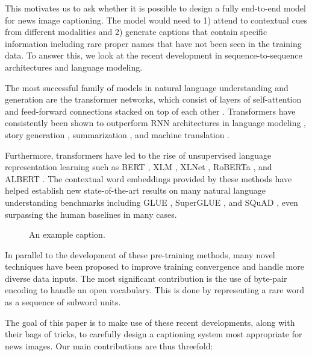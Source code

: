 \documentclass[10pt,twocolumn,letterpaper]{article}
\begin{document}
This motivates us to ask whether it is possible to design a fully end-to-end
model for news image captioning. The model would need to 1) attend to
contextual cues from different modalities and 2) generate captions that contain
specific information including rare proper names that have not been seen in the
training data. To answer this, we look at the recent development in
sequence-to-sequence architectures and language modeling.

The most successful family of models in natural language understanding and
generation are the transformer networks, which consist of layers of
self-attention and feed-forward connections stacked on top of each other
\cite{Vaswani2017AttentionIA}. Transformers have consistently been shown to
outperform RNN architectures in language modeling \cite{Radford2019LanguageMA},
story generation \cite{Fan2018HierarchicalNS}, summarization
\cite{Subramanian2019OnEA}, and machine translation \cite{Bojar2018Findings}.

Furthermore, transformers have led to the rise of unsupervised language
representation learning such as BERT \cite{Devlin2019BERT}, XLM
\cite{Lample2019CrosslingualLM}, XLNet \cite{Yang2019XLNetGA}, RoBERTa
\cite{Liu2019RoBERTaAR}, and ALBERT \cite{Lan2019ALBERT}. The contextual word
embeddings provided by these methods have helped establish new state-of-the-art
results on many natural language understanding benchmarks including GLUE
\cite{Wang2019GLUE}, SuperGLUE \cite{Wang2019SuperGLUEAS}, and SQuAD
\cite{Rajpurkar2016SQuAD, Rajpurkar2018KnowWY}, even surpassing the human
baselines in many cases.

\begin{figure}[t]
   \begin{center}
   \fbox{\rule{0pt}{2in} \rule{0.9\linewidth}{0pt}}
   \end{center}
      \caption{An example caption.}
   \label{fig:long}
   \label{fig:onecol}
\end{figure}

In parallel to the development of these pre-training methods, many novel
techniques have been proposed to improve training convergence and handle more
diverse data inputs. The most significant contribution is the use of byte-pair
encoding \cite{Sennrich2015NeuralMT} to handle an open vocabulary. This is done
by representing a rare word as a sequence of subword units.

The goal of this paper is to make use of these recent developments, along with
their bags of tricks, to carefully design a captioning system most appropriate
for news images. Our main contributions are thus threefold:
\end{document}
